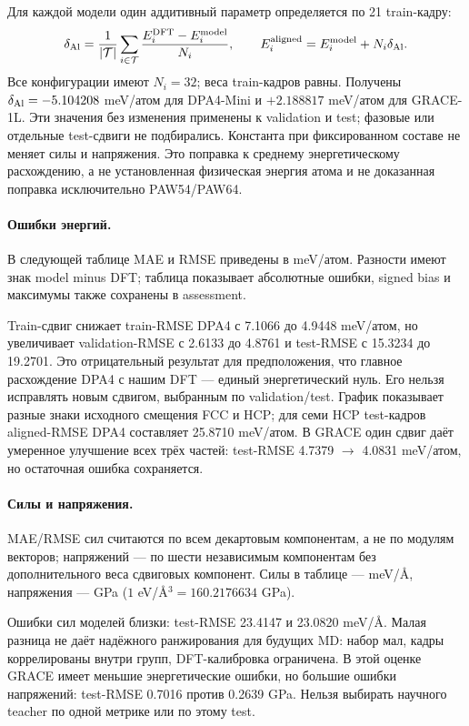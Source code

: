\documentclass[11pt,a4paper]{article}
\begin{document}
Для каждой модели один аддитивный параметр определяется по 21 train-кадру:
\[
 \delta_{\rm Al}=\frac{1}{|\mathcal T|}\sum_{i\in\mathcal T}
   \frac{E_i^{\rm DFT}-E_i^{\rm model}}{N_i},\qquad
 E_i^{\rm aligned}=E_i^{\rm model}+N_i\delta_{\rm Al}.
\]
Все конфигурации имеют $N_i=32$; веса train-кадров равны.
Получены $\delta_{\rm Al}=-5.104208$ meV/атом для DPA4-Mini и
$+2.188817$ meV/атом для GRACE-1L. Эти значения без изменения применены
к validation и test; фазовые или отдельные test-сдвиги не подбирались.
Константа при фиксированном составе не меняет силы и напряжения.
Это поправка к среднему энергетическому расхождению, а не установленная
физическая энергия атома и не доказанная поправка исключительно PAW54/PAW64.

\paragraph{Ошибки энергий.}
В следующей таблице MAE и RMSE приведены в meV/атом.
Разности имеют знак model minus DFT; таблица показывает абсолютные
ошибки, signed bias и максимумы также сохранены в assessment.

Train-сдвиг снижает train-RMSE DPA4 с 7.1066 до 4.9448 meV/атом,
но увеличивает validation-RMSE с 2.6133 до 4.8761 и test-RMSE
с 15.3234 до 19.2701. Это отрицательный результат для предположения,
что главное расхождение DPA4 с нашим DFT --- единый энергетический нуль.
Его нельзя исправлять новым сдвигом, выбранным по validation/test.
График показывает разные знаки исходного смещения FCC и HCP;
для семи HCP test-кадров aligned-RMSE DPA4 составляет 25.8710 meV/атом.
В GRACE один сдвиг даёт умеренное улучшение всех трёх частей:
test-RMSE 4.7379 $\to$ 4.0831 meV/атом, но остаточная ошибка сохраняется.

\paragraph{Силы и напряжения.}
MAE/RMSE сил считаются по всем декартовым компонентам, а не по модулям
векторов; напряжений --- по шести независимым компонентам без
дополнительного веса сдвиговых компонент. Силы в таблице --- meV/\AA,
напряжения --- GPa ($1$ eV/\AA$^3=160.2176634$ GPa).

Ошибки сил моделей близки: test-RMSE 23.4147 и 23.0820 meV/\AA.
Малая разница не даёт надёжного ранжирования для будущих MD:
набор мал, кадры коррелированы внутри групп, DFT-калибровка ограничена.
В этой оценке GRACE имеет меньшие энергетические ошибки, но большие
ошибки напряжений: test-RMSE 0.7016 против 0.2639 GPa.
Нельзя выбирать научного teacher по одной метрике или по этому test.
\end{document}
